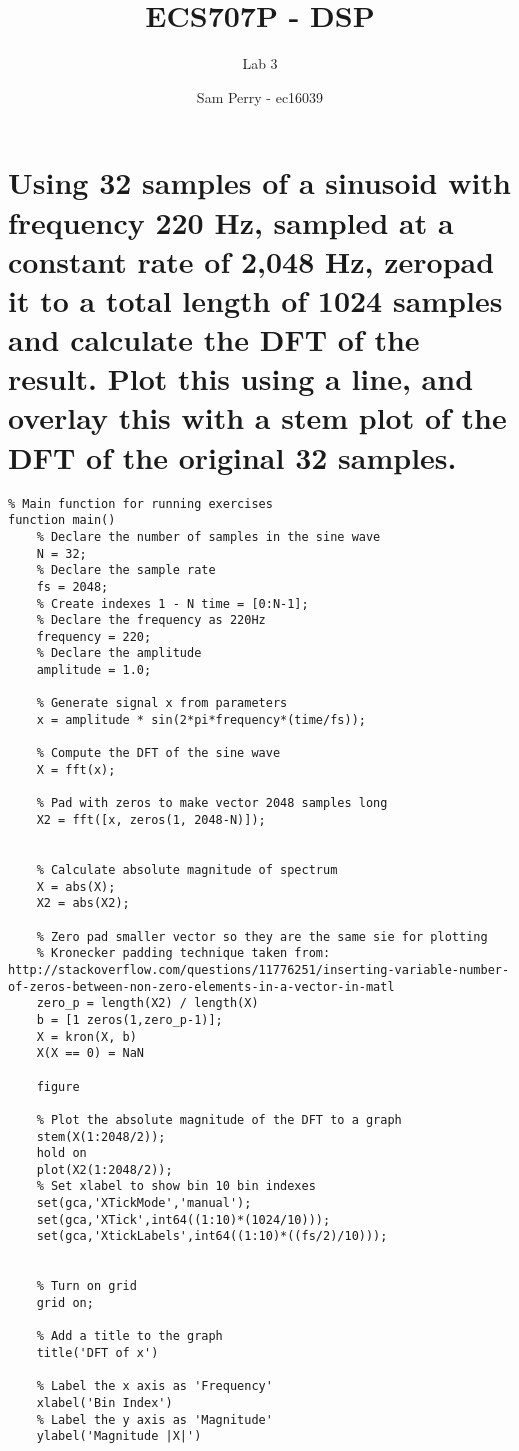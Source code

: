 \documentclass[titlepage]{scrartcl}
\begin{document}
\title{ECS707P - DSP}
\subtitle{\LARGE{Lab 3}}
\author{Sam Perry - ec16039}

\maketitle

\section{Using 32 samples of a sinusoid with frequency 220 Hz, sampled at a
constant rate of 2,048 Hz, zeropad it to a total length of 1024 samples and
calculate the DFT of the result. Plot this using a line, and overlay this with
a stem plot of the DFT of the original 32 samples.}
\begin{lstlisting}
% Main function for running exercises
function main()
    % Declare the number of samples in the sine wave
    N = 32;
    % Declare the sample rate
    fs = 2048;
    % Create indexes 1 - N time = [0:N-1];
    % Declare the frequency as 220Hz
    frequency = 220;
    % Declare the amplitude
    amplitude = 1.0;

    % Generate signal x from parameters
    x = amplitude * sin(2*pi*frequency*(time/fs));

    % Compute the DFT of the sine wave
    X = fft(x);
    
    % Pad with zeros to make vector 2048 samples long
    X2 = fft([x, zeros(1, 2048-N)]);


    % Calculate absolute magnitude of spectrum
    X = abs(X);
    X2 = abs(X2);

    % Zero pad smaller vector so they are the same sie for plotting
    % Kronecker padding technique taken from: http://stackoverflow.com/questions/11776251/inserting-variable-number-of-zeros-between-non-zero-elements-in-a-vector-in-matl
    zero_p = length(X2) / length(X)
    b = [1 zeros(1,zero_p-1)];
    X = kron(X, b)
    X(X == 0) = NaN

    figure

    % Plot the absolute magnitude of the DFT to a graph
    stem(X(1:2048/2));
    hold on
    plot(X2(1:2048/2));
    % Set xlabel to show bin 10 bin indexes
    set(gca,'XTickMode','manual');
    set(gca,'XTick',int64((1:10)*(1024/10)));
    set(gca,'XtickLabels',int64((1:10)*((fs/2)/10)));


    % Turn on grid
    grid on;
    
    % Add a title to the graph
    title('DFT of x')
    
    % Label the x axis as 'Frequency'
    xlabel('Bin Index')
    % Label the y axis as 'Magnitude'
    ylabel('Magnitude |X|')
\end{lstlisting}
\end{document}
